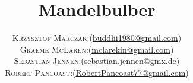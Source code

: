 % 
%





\newcommand{\mTitle}{Mandelbulber}
\newcommand{\mSubtitle}{End User Manual}
\newcommand{\mVersionDocument}{2.11.0.9.5}
\newcommand{\mDateDocument}{2017-April}
\newcommand{\mAuthor}{	
\begin{tabular}{r|p{11cm}}
	\textsc{Krzysztof Marczak:}
		& (\href{mailto:buddhi1980@gmail.com}
		{buddhi1980@gmail.com}) \\
	\textsc{Graeme McLaren:}
		& (\href{mailto:mclarekin@gmail.com}
		{mclarekin@gmail.com}) \\
	\textsc{Sebastian Jennen:}
		& (\href{mailto:sebastian.jennen@gmx.de}
		{sebastian.jennen@gmx.de}) \\
	\textsc{Robert Pancoast:}
		& (\href{mailto:RobertPancoast77@gmail.com}
		{RobertPancoast77@gmail.com})
\end{tabular}}


\title{\mTitle}
\author{\mAuthor}





